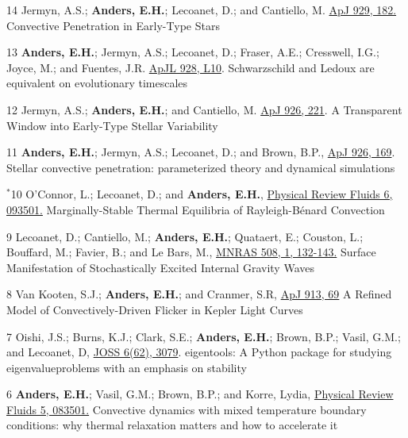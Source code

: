 \cvpub{}
	  {14}
	  {
		Jermyn, A.S.; \textbf{Anders, E.H.}; Lecoanet, D.; and Cantiello, M. 
        \href{https://iopscience.iop.org/article/10.3847/1538-4357/ac5f08}{ApJ 929, 182.}
	  }
	  {Convective Penetration in Early-Type Stars}

\cvpub{}
	  {13}
	  {
		\textbf{Anders, E.H.}; Jermyn, A.S.; Lecoanet, D.; Fraser, A.E.; Cresswell, I.G.; Joyce, M.; and Fuentes, J.R. 
        \href{https://iopscience.iop.org/article/10.3847/2041-8213/ac5cb5}{ApJL 928, L10}.
	  }
	  {Schwarzschild and Ledoux are equivalent on evolutionary timescales}

\cvpub{}
	  {12}
	  {
		Jermyn, A.S.; \textbf{Anders, E.H.}; and Cantiello, M. 
        \href{https://iopscience.iop.org/article/10.3847/1538-4357/ac4e89}{ApJ 926, 221}.
	  }
	  {A Transparent Window into Early-Type Stellar Variability}

\cvpub{}
	  {11}
	  {
		\textbf{Anders, E.H.}; Jermyn, A.S.; Lecoanet, D.; and Brown, B.P., 
        \href{https://iopscience.iop.org/article/10.3847/1538-4357/ac408d}{ApJ 926, 169}.
	  }
	  {Stellar convective penetration: parameterized theory and dynamical simulations}

	  {$^*$10}
	  {
		O'Connor, L.; Lecoanet, D.; and \textbf{Anders, E.H.}, 
		  \href{https://journals.aps.org/prfluids/abstract/10.1103/PhysRevFluids.6.093501}{Physical Review Fluids 6, 093501.}
	  }
	  {Marginally-Stable Thermal Equilibria of Rayleigh-B\'{e}nard Convection}

\cvpub{}
	  {9}
	  {
		Lecoanet, D.; Cantiello, M.; \textbf{Anders, E.H.}; Quataert, E.; Couston, L.; Bouffard, M.; Favier, B.; and Le Bars, M.,
          \href{https://doi.org/10.1093/mnras/stab2524}{MNRAS 508, 1, 132-143.}
	  }
	  {Surface Manifestation of Stochastically Excited Internal Gravity Waves}

\cvpub{}
	  {8}
	  {
		 Van Kooten, S.J.; \textbf{Anders, E.H.}; and Cranmer, S.R,
		  \href{https://iopscience.iop.org/article/10.3847/1538-4357/abf7bf}{ApJ 913, 69}
	  }
	  {A Refined Model of Convectively-Driven Flicker in Kepler Light Curves}

\cvpub{}
	  {7}
	  {
		Oishi, J.S.; Burns, K.J.; Clark, S.E.; \textbf{Anders, E.H.}; Brown, B.P.; Vasil, G.M.; and Lecoanet, D,
		  \href{https://joss.theoj.org/papers/10.21105/joss.03079}{JOSS 6(62), 3079}.
	  }
	  {eigentools: A Python package for studying eigenvalueproblems with an emphasis on stability}

	  {6}
	  {
		  \textbf{Anders, E.H.}; Vasil, G.M.; Brown, B.P.; and Korre, Lydia, 
		  \href{https://journals.aps.org/prfluids/abstract/10.1103/PhysRevFluids.5.083501}{Physical Review Fluids 5, 083501.}
	  }
	  {Convective dynamics with mixed temperature boundary conditions: why thermal relaxation matters and how to accelerate it}

